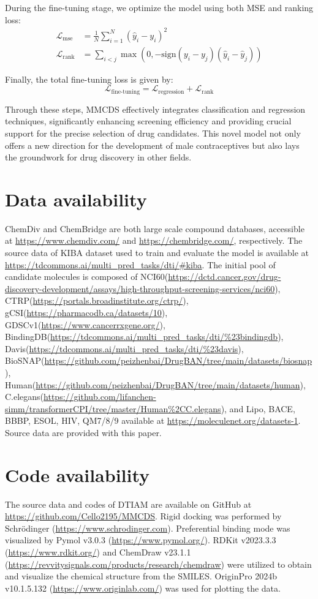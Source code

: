 \documentclass[unnumsec,webpdf,contemporary,large]{oup-authoring-template}%
\theoremstyle{thmstyleone}%
\theoremstyle{thmstyletwo}%
\theoremstyle{thmstylethree}%
\begin{document}
During the fine-tuning stage, we optimize the model using both MSE and ranking loss:
\begin{align}
\mathcal{L}_\text{mse} & = \frac{1}{N} \sum_{i = 1}^{N} (\hat{y}_i - y_i)^2 \\
\mathcal{L}_\text{rank} & = \sum_{i < j} \max\left(0, -\text{sign}(y_i - y_j)(\hat{y}_i - \hat{y}_j)\right)
\end{align}

Finally, the total fine-tuning loss is given by:
\begin{equation}
\mathcal{L}_\text{fine-tuning} = \mathcal{L}_\text{regression} +  \mathcal{L}_\text{rank}
\end{equation}


Through these steps, MMCDS effectively integrates classification and regression techniques, significantly enhancing screening efficiency and providing crucial support for the precise selection of drug candidates. This novel model not only offers a new direction for the development of male contraceptives but also lays the groundwork for drug discovery in other fields.


\section*{Data availability}

ChemDiv and ChemBridge are both large scale compound databases, accessible at \url{https://www.chemdiv.com/} and \url{https://chembridge.com/}, respectively. The source data of KIBA dataset used to train and evaluate the model is available at \url{https://tdcommons.ai/multi_pred_tasks/dti/#kiba}. The initial pool of candidate molecules is composed of NCI60(\url{https://dctd.cancer.gov/drug-discovery-development/assays/high-throughput-screening-services/nci60}), CTRP(\url{https://portals.broadinstitute.org/ctrp/}), gCSI(\url{https://pharmacodb.ca/datasets/10}), GDSCv1(\url{https://www.cancerrxgene.org/}), BindingDB(\url{https://tdcommons.ai/multi_pred_tasks/dti/%23bindingdb}), Davis(\url{https://tdcommons.ai/multi_pred_tasks/dti/%23davis}), BioSNAP(\url{https://github.com/peizhenbai/DrugBAN/tree/main/datasets/biosnap}), Human(\url{https://github.com/peizhenbai/DrugBAN/tree/main/datasets/human}), C.elegans(\url{https://github.com/lifanchen-simm/transformerCPI/tree/master/Human%2CC.elegans}), and Lipo, BACE, BBBP, ESOL, HIV, QM7/8/9 available at \url{https://moleculenet.org/datasets-1}. Source data are provided with this paper.


\section*{Code availability}
The source data and codes of DTIAM are available on GitHub at \url{https://github.com/Cello2195/MMCDS}. Rigid docking was performed by Schrödinger (\url{https://www.schrodinger.com}). Preferential binding mode was visualized by Pymol v3.0.3 (\url{https://www.pymol.org/}). RDKit v2023.3.3 (\url{https://www.rdkit.org/}) and ChemDraw v23.1.1 (\url{https://revvitysignals.com/products/research/chemdraw}) were utilized to obtain and visualize the chemical structure from the SMILES. OriginPro 2024b v10.1.5.132 (\url{https://www.originlab.com/}) was used for plotting the data.
\end{document}

